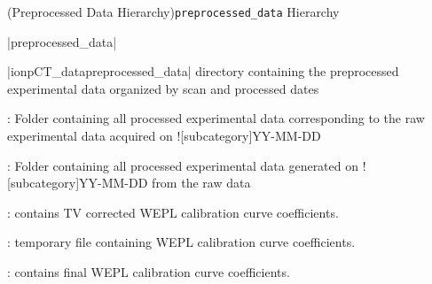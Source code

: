 \Subsection*(Preprocessed Data Hierarchy){\texttt{preprocessed\_data} Hierarchy}
\begin{tcbenvironment}|preprocessed\_data|
\begin{tcbparbox}|\dirsep ion\dirsep pCT\_data\dirsep preprocessed\_data|%
\bfdash directory containing the preprocessed experimental data organized by scan and processed dates
\end{tcbparbox}
\begin{tcbenumbox}
    \begin{ThinEnum}[labelindent=1pt, leftmargin=*]
        \item {} : Folder containing all processed experimental data corresponding to the raw experimental data acquired on \docentry![subcategory]{YY-MM-DD}
        \begin{ThinEnum}[labelindent=1pt, leftmargin=*]
            \item {} : Folder containing all processed experimental data generated on \docentry![subcategory]{YY-MM-DD} from the raw data
            \begin{ThinEnum}[labelindent=1pt, leftmargin=*]
                \item {} : contains TV corrected WEPL calibration curve coefficients.
            \item {} : temporary file containing WEPL calibration curve coefficients.
            \item {} : contains final WEPL calibration curve coefficients.

\end{ThinEnum}
\end{ThinEnum}
\end{ThinEnum}
\end{tcbenumbox}
\end{tcbenvironment}
